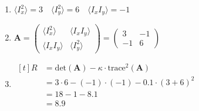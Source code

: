 \begin{enumerate}
	\item	$ \langle I_x^2 \rangle  = 3 \quad \langle I_y^2 \rangle  = 6 \quad \langle I_xI_y \rangle  = -1	      $\\
	\item $ \boldsymbol{A} = \begin{pmatrix}
			      \langle I_x^2 \rangle  & \langle I_xI_y \rangle \\
			      \langle I_xI_y \rangle & \langle I_y^2 \rangle
		      \end{pmatrix} =\begin{pmatrix}
			      3  & -1 \\
			      -1 & 6
		      \end{pmatrix}  $\\
	\item $
		      \begin{aligned}[t]
			      R & = \text{det}(\boldsymbol{A})- \kappa \cdot \text{trace}^2(\boldsymbol{A}) \\
			        & = 3 \cdot 6  - (-1) \cdot (-1) - 0.1 \cdot \left(3 + 6 \right)^2          \\
			        & = 18 -1 - 8.1                                                             \\
			        & =8.9
		      \end{aligned}
	      $
\end{enumerate}
